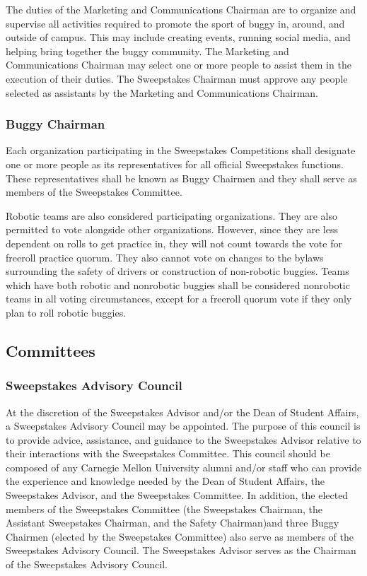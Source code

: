 	The duties of the Marketing and Communications Chairman are to organize and supervise all activities required to promote the sport of buggy in, around, and outside of campus. This may include creating events, running social media, and helping bring together the buggy community. The Marketing and Communications Chairman may select one or more people to assist them in the execution of their duties. The Sweepstakes Chairman must approve any people selected as assistants by the Marketing and Communications Chairman. 

\subsubsection{Buggy Chairman}

	Each organization participating in the Sweepstakes Competitions shall designate one or more people as its representatives for all official Sweepstakes functions. These representatives shall be known as Buggy Chairmen and they shall serve as members of the Sweepstakes Committee.

	Robotic teams are also considered participating organizations. They are also permitted to vote alongside other organizations. However, since they are less dependent on rolls to get practice in, they will not count towards the vote for freeroll practice quorum. They also cannot vote on changes to the bylaws surrounding the safety of drivers or construction of non-robotic buggies. Teams which have both robotic and nonrobotic buggies shall be considered nonrobotic teams in all voting circumstances, except for a freeroll quorum vote if they only plan to roll robotic buggies. 

\subsection{Committees}

\subsubsection{Sweepstakes Advisory Council}

	At the discretion of the Sweepstakes Advisor and/or the Dean of Student Affairs, a Sweepstakes Advisory Council may be appointed. The purpose of this council is to provide advice, assistance, and guidance to the Sweepstakes Advisor relative to their interactions with the Sweepstakes Committee. This council should be composed of any Carnegie Mellon University alumni and/or staff who can provide the experience and knowledge needed by the Dean of Student Affairs, the Sweepstakes Advisor, and the Sweepstakes Committee. In addition, the elected members of the Sweepstakes Committee (the Sweepstakes Chairman, the Assistant Sweepstakes Chairman, and the Safety Chairman)and three Buggy Chairmen (elected by the Sweepstakes Committee) also serve as members of the Sweepstakes Advisory Council. The Sweepstakes Advisor serves as the Chairman of the Sweepstakes Advisory Council.

